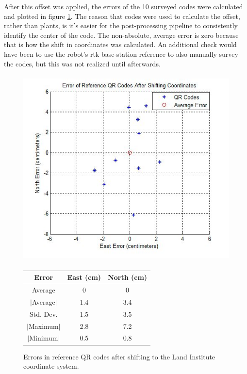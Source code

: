After this offset was applied, the errors of the 10 surveyed codes were calculated and plotted in figure \ref{figure:code_errors}.  The reason that codes were used to calculate the offset, rather than plants, is it's easier for the post-processing pipeline to consistently identify the center of the code.  The non-absolute, average error is zero because that is how the shift in coordinates was calculated.  An additional check would have been to use the robot's \ac{rtk} base-station reference to also manually survey the codes, but this was not realized until afterwards.

  \begin{figure}
	\centering
    \includegraphics[height=4in]{figures/code_errors.jpg}
    \newline
    \newline
    \centering
    \begin{tabular}[c]{|c|c|c|}
       \hline
        Error & East (cm) & North (cm) \\ 
        \hline
        Average   & 0 & 0             \\
        $|$Average$|$ & 1.4 & 3.4       \\
        Std. Dev. & 1.5 & 3.5         \\
        $|$Maximum$|$   & 2.8 & 7.2       \\
        $|$Minimum$|$   & 0.5 & 0.8       \\
        \hline
    \end{tabular}
    \captionsetup{labelformat=andtable}
    \caption[Errors in reference QR codes]{Errors in reference QR codes after shifting to the Land Institute coordinate system.}
    \label{figure:code_errors}
  \end{figure}

